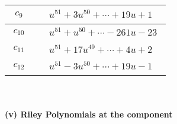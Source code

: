 \documentclass[1p]{elsarticle_modified}
\theoremstyle{definition}
\begin{document}
\begin{tabular}{m{50pt}|m{274pt}}
\hline $$\begin{aligned}c_{9}\end{aligned}$$&$\begin{aligned}
&u^{51}+3 u^{50}+\cdots+19 u+1
\end{aligned}$\\
\hline $$\begin{aligned}c_{10}\end{aligned}$$&$\begin{aligned}
&u^{51}+u^{50}+\cdots-261 u-23
\end{aligned}$\\
\hline $$\begin{aligned}c_{11}\end{aligned}$$&$\begin{aligned}
&u^{51}+17 u^{49}+\cdots+4 u+2
\end{aligned}$\\
\hline $$\begin{aligned}c_{12}\end{aligned}$$&$\begin{aligned}
&u^{51}-3 u^{50}+\cdots+19 u-1
\end{aligned}$\\
\hline
\end{tabular}\\~\\
\newpage\renewcommand{\arraystretch}{1}
\flushleft \textbf{(v) Riley Polynomials at the component}\newline \\
\end{document}

